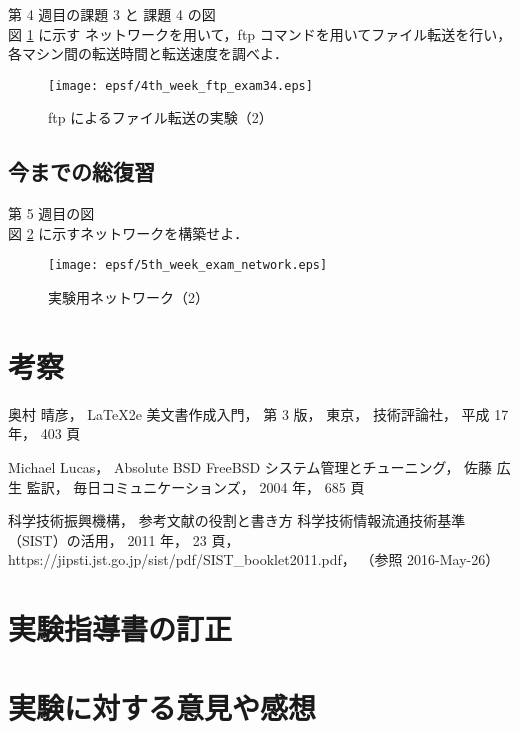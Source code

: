\documentclass[a4j]{jreport}
\begin{document}
第 4 週目の課題 3 と 課題 4 の図\\

図 \ref{Figure: ftp によるファイル転送の実験（2）} に示す
ネットワークを用いて，ftp コマンドを用いてファイル転送を行い，
各マシン間の転送時間と転送速度を調べよ．

\begin{figure}[H]
  \centering
  \texttt{[image: epsf/4th\_week\_ftp\_exam34.eps]}
  \vspace*{-0.3cm}
  \caption{ftp によるファイル転送の実験（2）}
  \label{Figure: ftp によるファイル転送の実験（2）}
\end{figure}


\newpage				%
\section{今までの総復習}

第 5 週目の図\\

図 \ref{Figure: 実験用ネットワーク（2）} に示すネットワークを構築せよ．

\begin{figure}[H]
  \centering
  \texttt{[image: epsf/5th\_week\_exam\_network.eps]}
  \vspace*{-0.3cm}
  \caption{実験用ネットワーク（2）}
  \label{Figure: 実験用ネットワーク（2）}
\end{figure}


\chapter{考察}

%
%
%
\begin{thebibliography}{99}
	奥村 晴彦，						%
	\LaTeX2e 美文書作成入門，				%
	第 3 版，						%
	東京，							%
	技術評論社，						%
	平成 17 年，						%
	403 頁							%

	Michael Lucas，						%
	Absolute BSD FreeBSD システム管理とチューニング，	%
	佐藤 広生 監訳，					%
	毎日コミュニケーションズ，				%
	2004 年，						%
	685 頁							%

	科学技術振興機構，					%
	参考文献の役割と書き方 科学技術情報流通技術基準（SIST）の活用，%
	2011 年，						%
	23 頁，
	https://jipsti.jst.go.jp/sist/pdf/SIST\_booklet2011.pdf，%
	（参照 2016-May-26）					%

\end{thebibliography}


\chapter{実験指導書の訂正}


\chapter{実験に対する意見や感想}
\end{document}
